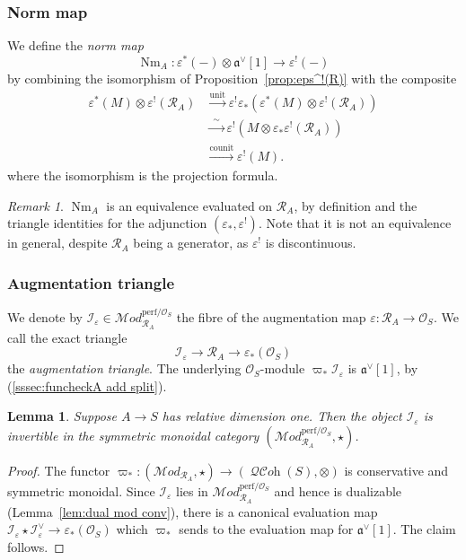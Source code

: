 \documentclass[12pt, oneside]{amsart}
\numberwithin{equation}{section}
\newtheorem{lemma}[subsubsection]{Lemma}
\theoremstyle{remark}
\newtheorem{remark}[subsubsection]{Remark}
\theoremstyle{plain}
\newcommand{\MOD}{\mathcal{M}\textit{od}}
\DeclareMathOperator{\QCOH}{\mathcal{QC}\textit{oh}}
\newcommand{\R}{\mathcal{R}}
\newcommand{\RA}{\R_A}
\newcommand{\frav}{\mathfrak{a}^\vee}
\newcommand{\OO}{\mathcal{O}}
\newcommand{\Nm}{\operatorname{Nm}}
\newcommand{\eps}{\varepsilon}
\begin{document}
\subsubsection{Norm map}\label{sssec:norm Mod_RA}

We define the \emph{norm map}
\begin{equation}\label{eq:norm}
  \Nm_A : \eps^*(-) \otimes \frav[1] \to \eps^!(-)
\end{equation}
by combining the isomorphism of Proposition~\ref{prop:eps^!(R)} with the composite
\[\begin{aligned}
  \eps^*(M) \otimes \eps^!(\RA)
    &\xrightarrow{\mathrm{unit}}
      \eps^!\eps_*\!\left(\eps^*(M) \otimes \eps^!(\RA)\right)\\
    &\xrightarrow{\,\ \sim\ \,} \eps^!\!\left(M \otimes \eps_*\eps^!(\RA)\right) \\
    &\xrightarrow{\mathrm{counit}} \eps^!(M).
\end{aligned}\]
where the isomorphism is the projection formula.

\begin{remark}\label{norm iso} $\Nm_A$ is an equivalence evaluated on $\RA$, by definition and the triangle identities for the adjunction $(\varepsilon_*,\varepsilon^!)$. Note that it is not an equivalence in general, despite $\RA$ being a generator, as $\eps^!$ is discontinuous.\end{remark}

\subsubsection{Augmentation triangle}

We denote by $\mathcal{I}_\eps \in \MOD_{\RA}^{\mathrm{perf}/\OO_S}$ the fibre of the augmentation map $\eps : \RA \to \OO_S$.
We call the exact triangle
\begin{equation}\label{eq:aug triangle}
	\mathcal{I}_\eps
	\to \RA
	\to \eps_*(\OO_S)
\end{equation}
the \emph{augmentation triangle}.
The underlying $\OO_S$-module $\varpi_*\mathcal{I}_\eps$ is $\frav[1]$, by (\ref{sssec:funcheckA add split}).

\begin{lemma}\label{lem:Ieps inv}
  Suppose $A \to S$ has relative dimension one.
  Then the object $\mathcal{I}_\eps$ is invertible in the symmetric monoidal category $(\MOD^{\mathrm{perf}/\OO_S}_{\RA}, \star)$.
\end{lemma}
\begin{proof}
  The functor $\varpi_* : (\MOD_{\RA}, \star) \to (\QCOH(S), \otimes)$ is conservative and symmetric monoidal.
  Since $\mathcal{I}_{\eps}$ lies in $\MOD_{\RA}^{\mathrm{perf}/\OO_S}$ and hence is dualizable (Lemma~\ref{lem:dual mod conv}), there is a canonical evaluation map $\mathcal{I}_{\eps} \star \mathcal{I}_{\eps}^\vee \to \eps_*(\OO_S)$ which $\varpi_*$ sends to the evaluation map for $\frav[1]$.
  The claim follows.
\end{proof}
\end{document}
